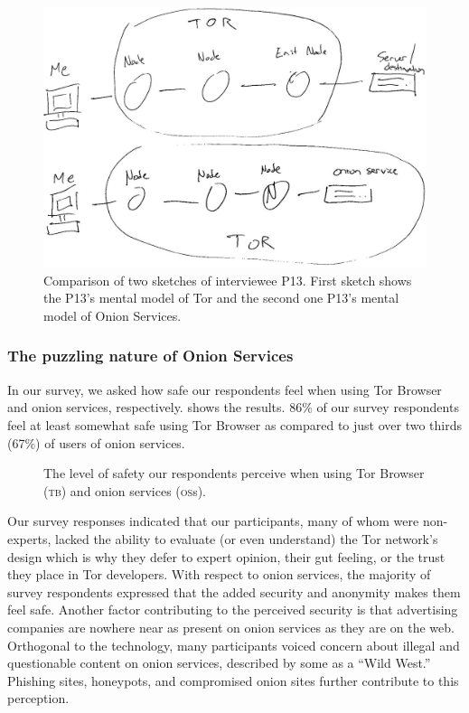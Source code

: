\begin{figure}[!ht]
        \centering
        \includegraphics[width=0.8\linewidth]{paper/figures/P13bothSketches.jpg}
        \caption{Comparison of two sketches of interviewee P13. First sketch shows the P13’s mental model of Tor and the second one P13’s mental model of Onion Services. }
        \label{fig:toros-sketch}
\end{figure}




\subsubsection{The puzzling nature of Onion Services}
In our survey, we asked how safe our
respondents feel when using Tor Browser and onion services, respectively.
 shows the results.  
86\% of our survey respondents feel at least somewhat safe using Tor Browser as compared to just over two thirds (67\%) of users of onion services.

\begin{figure}[t]
    \centering
    
    \caption{The level of safety our respondents perceive when using Tor
    Browser (\textsc{tb}) and onion services (\textsc{os}s).}
    \label{fig:perceived-security}
\end{figure}

Our survey responses indicated that our participants, many of whom were non-experts,  lacked the ability to evaluate (or even understand) the
Tor network's design which is why they defer to expert opinion, their gut
feeling, or the trust they place in Tor developers.  With respect to onion
services, the majority of survey respondents expressed that the added security and anonymity makes
them feel safe.  Another factor contributing to the perceived security is that
advertising companies are nowhere near as present on onion services as they are
on the web.  Orthogonal to the technology, many participants voiced concern
about illegal and questionable content on onion services, described by some as a
``Wild West.'' Phishing sites, honeypots, and compromised onion sites further
contribute to this perception.

